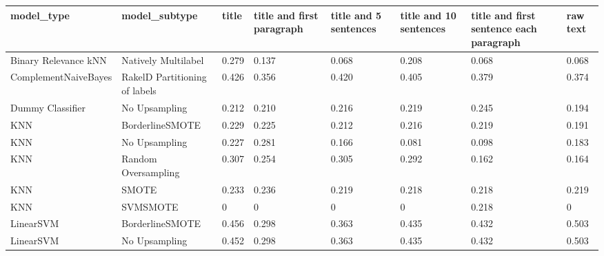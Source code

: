 \begin{tabular}{llllllll}
\toprule
                     model\_type &                 model\_subtype & title & title and first paragraph & title and 5 sentences & title and 10 sentences & title and first sentence each paragraph & raw text \\
\midrule
           Binary Relevance kNN &           Natively Multilabel & 0.279 &                     0.137 &                 0.068 &                  0.208 &                                   0.068 &    0.068 \\
           ComplementNaiveBayes & RakelD Partitioning of labels & 0.426 &                     0.356 &                 0.420 &                  0.405 &                                   0.379 &    0.374 \\
               Dummy Classifier &                 No Upsampling & 0.212 &                     0.210 &                 0.216 &                  0.219 &                                   0.245 &    0.194 \\
                            KNN &               BorderlineSMOTE & 0.229 &                     0.225 &                 0.212 &                  0.216 &                                   0.219 &    0.191 \\
                            KNN &                 No Upsampling & 0.227 &                     0.281 &                 0.166 &                  0.081 &                                   0.098 &    0.183 \\
                            KNN &           Random Oversampling & 0.307 &                     0.254 &                 0.305 &                  0.292 &                                   0.162 &    0.164 \\
                            KNN &                         SMOTE & 0.233 &                     0.236 &                 0.219 &                  0.218 &                                   0.218 &    0.219 \\
                            KNN &                      SVMSMOTE &     0 &                         0 &                     0 &                      0 &                                   0.218 &        0 \\
                      LinearSVM &               BorderlineSMOTE & 0.456 &                     0.298 &                 0.363 &                  0.435 &                                   0.432 &    0.503 \\
                      LinearSVM &                 No Upsampling & 0.452 &                     0.298 &                 0.363 &                  0.435 &                                   0.432 &    0.503 \\

\end{tabular}
